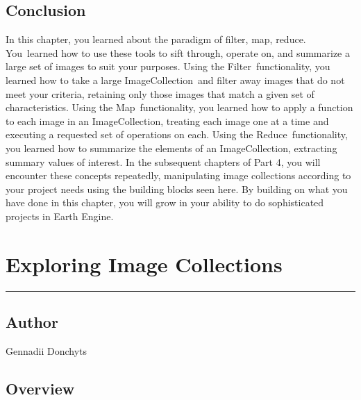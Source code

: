 \documentclass[
  letterpaper,
  DIV=11,
  numbers=noendperiod]{scrreprt}
\begin{document}
\hypertarget{conclusion-7}{%
\section*{Conclusion}\label{conclusion-7}}


In this chapter, you learned about the paradigm of filter, map, reduce.
You~learned how to use these tools to sift through, operate on, and
summarize a large set of images to suit your purposes. Using the
Filter~functionality, you learned how to take a large
ImageCollection~and filter away images that do not meet your criteria,
retaining only those images that match a given set of characteristics.
Using the Map~functionality, you learned how to apply a function to each
image in an ImageCollection, treating each image one at a time and
executing a requested set of operations on each. Using the
Reduce~functionality, you learned how to summarize the elements of an
ImageCollection, extracting summary values of interest. In the
subsequent chapters of Part 4, you will encounter these concepts
repeatedly, manipulating image collections according to your project
needs using the building blocks seen here. By building on what you have
done in this chapter, you will grow in your ability to do sophisticated
projects in Earth Engine.

\hypertarget{exploring-image-collections}{%
\chapter{Exploring Image
Collections}\label{exploring-image-collections}}

\begin{center}\rule{0.5\linewidth}{0.5pt}\end{center}

\hypertarget{author-6}{%
\section*{Author}\label{author-6}}


Gennadii Donchyts

\hypertarget{overview-8}{%
\section*{Overview}\label{overview-8}}

\end{document}

